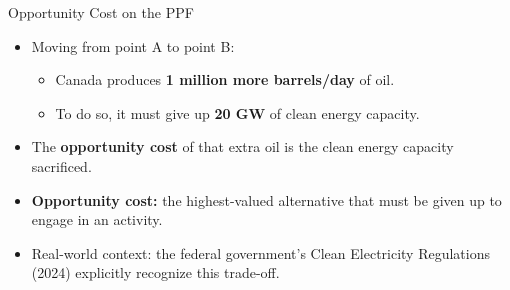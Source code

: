 \documentclass[aspectratio=169]{beamer}
\begin{document}
\begin{frame}{Opportunity Cost on the PPF}
\transfade
\begin{itemize}
  \item Moving from point A to point B:
  \begin{itemize}
    \item Canada produces \textbf{1 million more barrels/day} of oil.
    \item To do so, it must give up \textbf{20 GW} of clean energy capacity.
  \end{itemize}
  \item The \textbf{opportunity cost} of that extra oil is the clean energy capacity sacrificed.
  \item \textbf{Opportunity cost:} the highest-valued alternative that must be given up to engage in an activity.
  \item Real-world context: the federal government's Clean Electricity Regulations (2024) explicitly recognize this trade-off.
\end{itemize}
\end{frame}
\end{document}
